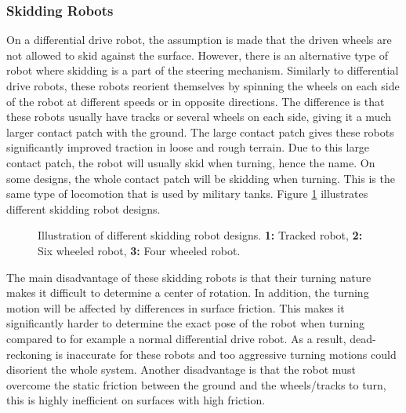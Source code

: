 

\subsubsection{Skidding Robots}
On a differential drive robot, the assumption is made that the driven wheels are not allowed to skid against the surface. However, there is an alternative type of robot where skidding is a part of the steering mechanism. Similarly to differential drive robots, these robots reorient themselves by spinning the wheels on each side of the robot at different speeds or in opposite directions. The difference is that these robots usually have tracks or several wheels on each side, giving it a much larger contact patch with the ground. The large contact patch gives these robots significantly improved traction in loose and rough terrain. Due to this large contact patch, the robot will usually skid when turning, hence the name. On some designs, the whole contact patch will be skidding when turning. This is the same type of locomotion that is used by military tanks\cite{SiegwartRoland2011Itam}. Figure \ref{fig:skidDrive} illustrates different skidding robot designs.

\begin{figure}[H]
  \centering
  
  \caption{Illustration of different skidding robot designs. \textbf{1:} Tracked robot, \textbf{2:} Six wheeled robot, \textbf{3:} Four wheeled robot. }
  \label{fig:skidDrive}
\end{figure}

The main disadvantage of these skidding robots is that their turning nature makes it difficult to determine a center of rotation. In addition, the turning motion will be affected by differences in surface friction. This makes it significantly harder to determine the exact pose of the robot when turning compared to for example a normal differential drive robot. As a result, dead-reckoning is inaccurate for these robots and too aggressive turning motions could disorient the whole system. Another disadvantage is that the robot must overcome the static friction between the ground and the wheels/tracks to turn, this is highly inefficient on surfaces with high friction.




